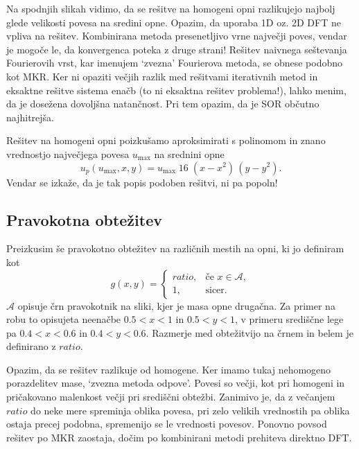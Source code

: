 Na spodnjih slikah vidimo, da se rešitve na homogeni opni razlikujejo najbolj glede velikosti povesa na sredini opne. Opazim, da uporaba 1D oz. 2D DFT ne vpliva na rešitev. Kombinirana metoda presenetljivo vrne največji poves, vendar je mogoče le, da konvergenca poteka z druge strani! Rešitev naivnega seštevanja Fourierovih vrst, kar imenujem `zvezna' Fourierova metoda, se obnese podobno kot MKR. Ker ni opaziti večjih razlik med rešitvami iterativnih metod in eksaktne rešitve sistema enačb (to ni eksaktna rešitev problema!), lahko menim, da je dosežena dovoljšna natančnost. Pri tem opazim, da je SOR občutno najhitrejša.


Rešitev na homogeni opni poizkušamo aproksimirati s polinomom in znano vrednostjo največjega povesa $u_{\max}$ na srednini opne 
\begin{equation}
    u_p(u_{\max},x,y) = u_{\max}\;16\;(x-x^2)\,(y-y^2).
\end{equation}
Vendar se izkaže, da je tak popis podoben rešitvi, ni pa popoln!

\subsection{Pravokotna obtežitev}

Preizkusim še pravokotno obtežitev na različnih mestih na opni, ki jo definiram kot 
\begin{equation}
    g(x,y) = \begin{cases}
        ratio, & \text{če } x\in \mathcal{A},\\
        1, & \text{sicer}.
    \end{cases}
\end{equation}
$\mathcal{A}$ opisuje črn pravokotnik na sliki, kjer je masa opne drugačna. Za primer na robu to opisujeta neenačbe $0.5<x<1$ in $0.5<y<1$, v primeru središčne lege pa $0.4<x<0.6$ in $0.4<y<0.6$. Razmerje med obtežitvijo na črnem in belem je definirano z $ratio$.

Opazim, da se rešitev razlikuje od homogene. Ker imamo tukaj nehomogeno porazdelitev mase, `zvezna metoda odpove'. Povesi so večji, kot pri homogeni in pričakovano malenkost večji pri središčni obtežbi. Zanimivo je, da z večanjem $ratio$ do neke mere spreminja oblika povesa, pri zelo velikih vrednostih pa oblika ostaja precej podobna, spremenijo se le vrednosti povesov. Ponovno povsod rešitev po MKR zaostaja, dočim po kombinirani metodi prehiteva direktno DFT.

